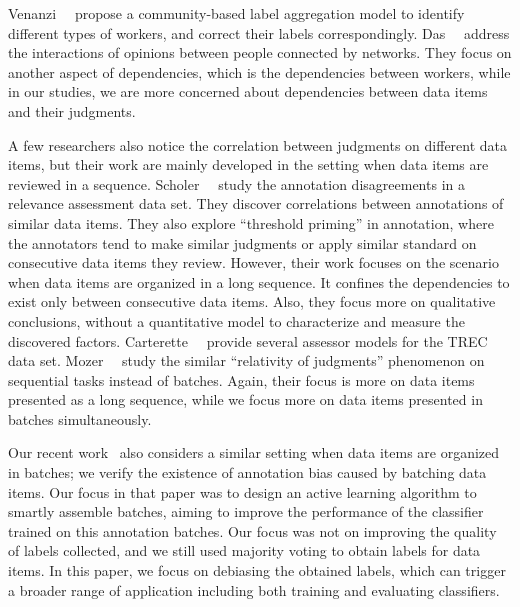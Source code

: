 Venanzi~\etal~\cite{venanzi:www2014} propose a community-based label aggregation model to identify different types of workers, 
and correct their labels correspondingly.  
Das~\etal~\cite{das:kdd2013} address the interactions of opinions between people connected by networks.
They focus on another aspect of dependencies, 
which is the dependencies between workers, 
while in our studies, we are more concerned about dependencies between data items and their judgments.  



A few researchers also notice the correlation between judgments on different data items, 
but their work are mainly developed in the setting when data items are reviewed in a sequence.  
Scholer~\etal~\cite{scholer:sigir2013,scholer:sigir2011} study the annotation disagreements in 
a relevance assessment data set.  
They discover correlations between annotations of similar data items.  %
They also explore ``threshold priming'' in annotation, 
where the annotators tend to make similar judgments or apply similar standard on consecutive data items they review. 
However, their work focuses on the scenario when data items are organized in a long sequence.  
It confines the dependencies to exist only between consecutive data items.  
Also, they focus more on qualitative conclusions, without a quantitative model to characterize and measure the discovered factors.  
Carterette~\etal~\cite{carterette:effect2010} provide several assessor models for the TREC data set.  
Mozer~\etal~\cite{mozer:nips2010} study the similar ``relativity of
judgments'' phenomenon on sequential tasks instead of batches.  
Again, their focus is more on data items presented as a long sequence, 
while we focus more on data items presented in batches simultaneously.  

Our recent work~\cite{zhuang:wsdm2015} also considers a similar setting 
when data items are organized in batches; 
we verify the existence of annotation bias caused by batching data items.  
Our focus in that paper was to design an active learning algorithm to smartly assemble batches, 
aiming to improve the performance of the classifier trained on this annotation batches.  
Our focus was not on improving the quality of labels collected, 
and we still used majority voting to obtain labels for data items.  
In this paper, we focus on debiasing the obtained labels, 
which can trigger a broader range of application 
including both training and evaluating classifiers.



